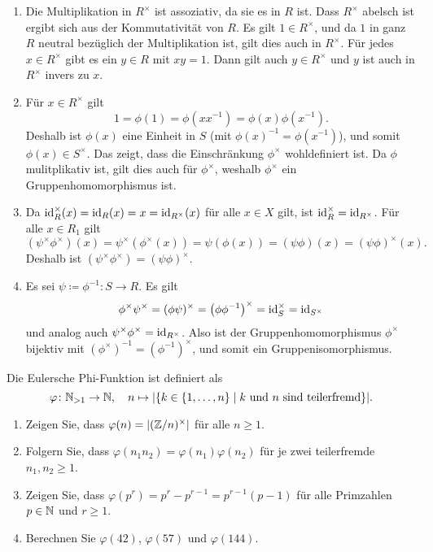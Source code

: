 \begin{solution}
  \begin{enumerate}
    \item
      Die Multiplikation in $R^\times$ ist assoziativ, da sie es in $R$ ist.
      Dass $R^\times$ abelsch ist ergibt sich aus der Kommutativität von $R$.
      Es gilt $1 \in R^\times$, und da $1$ in ganz $R$ neutral bezüglich der Multiplikation ist, gilt dies auch in $R^\times$.
      Für jedes $x \in R^\times$ gibt es ein $y \in R$ mit $xy = 1$.
      Dann gilt auch $y \in R^\times$ und $y$ ist auch in $R^\times$ invers zu $x$.
    \item
      Für $x \in R^\times$ gilt
      \[
          1
        = \phi(1)
        = \phi(x x^{-1})
        = \phi(x) \phi(x^{-1}).
      \]
      Deshalb ist $\phi(x)$ eine Einheit in $S$ (mit $\phi(x)^{-1} = \phi(x^{-1})$), und somit $\phi(x) \in S^\times$.
      Das zeigt, dass die Einschränkung $\phi^\times$ wohldefiniert ist.
      Da $\phi$ mulitplikativ ist, gilt dies auch für $\phi^\times$, weshalb $\phi^\times$ ein Gruppenhomomorphismus ist.
    \item
      Da $\operatorname{id}_R^\times(x) = \operatorname{id}_R(x) = x = \operatorname{id}_{R^\times}(x)$ für alle $x \in X$ gilt, ist $\operatorname{id}_R^\times = \operatorname{id}_{R^\times}$.
      Für alle $x \in R_1$ gilt
      \[
          (\psi^\times \phi^\times)(x)
        = \psi^\times(\phi^\times(x))
        = \psi(\phi(x))
        = (\psi \phi)(x)
        = (\psi \phi)^\times(x).
      \]
      Deshalb ist $(\psi^\times \phi^\times) = (\psi \phi)^\times$.
    \item
      Es sei $\psi \coloneqq \phi^{-1} \colon S \to R$.
      Es gilt
      \[
          \phi^\times \psi^\times
        = (\phi \psi)^\times
        = \left( \phi \phi^{-1} \right)^\times
        = \operatorname{id}_S^\times
        = \operatorname{id}_{S^\times}
      \]
      und analog auch $\psi^\times \phi^\times = \operatorname{id}_{R^\times}$.
      Also ist der Gruppenhomomorphismus $\phi^\times$ bijektiv mit $(\phi^\times)^{-1} = (\phi^{-1})^\times$, und somit ein Gruppenisomorphismus.
  \end{enumerate}
\end{solution}


\begin{question}
  Die Eulersche Phi-Funktion ist definiert als
  \[
            \varphi
    \colon  \mathbb{N}_{>1} \to \mathbb{N},
    \quad   n \mapsto |\{ k \in \{1, \dotsc, n\} \mid \text{$k$ und $n$ sind teilerfremd} \}|.
  \]
  \begin{enumerate}
    \item
      Zeigen Sie, dass $\varphi(n) = | (\mathbb{Z}/n)^\times |$ für alle $n \geq 1$.
    \item
      Folgern Sie, dass $\varphi(n_1 n_2) = \varphi(n_1) \varphi(n_2)$ für je zwei teilerfremde $n_1, n_2 \geq 1$.
    \item
      Zeigen Sie, dass $\varphi(p^r) = p^r - p^{r-1} = p^{r-1} (p - 1)$ für alle Primzahlen $p \in \mathbb{N}$ und $r \geq 1$.
    \item
      Berechnen Sie $\varphi(42)$, $\varphi(57)$ und $\varphi(144)$.
  \end{enumerate}
\end{question}


